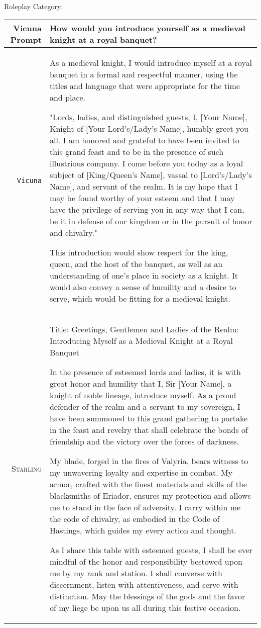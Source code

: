 \documentclass{article}
\newlength\mydepth
\newcommand{\starlingemojititle}{\textsc{Starling}\raisebox{-\mydepth}{\texttt{[image: images/starling-final.png]}}}
\begin{document}
{\newpage
Roleplay Category:

{  \footnotesize \begin{tabularx}{\linewidth}{r X} \toprule Vicuna Prompt  & {\bf How would you introduce yourself as a medieval knight at a royal banquet?}
\\
 \midrule \texttt{Vicuna}  &
As a medieval knight, I would introduce myself at a royal banquet in a formal and respectful manner, using the titles and language that were appropriate for the time and place.

"Lords, ladies, and distinguished guests, I, [Your Name], Knight of [Your Lord's/Lady's Name], humbly greet you all. I am honored and grateful to have been invited to this grand feast and to be in the presence of such illustrious company. I come before you today as a loyal subject of [King/Queen's Name], vassal to [Lord's/Lady's Name], and servant of the realm. It is my hope that I may be found worthy of your esteem and that I may have the privilege of serving you in any way that I can, be it in defense of our kingdom or in the pursuit of honor and chivalry."

This introduction would show respect for the king, queen, and the host of the banquet, as well as an understanding of one's place in society as a knight. It would also convey a sense of humility and a desire to serve, which would be fitting for a medieval knight.
\\
 \midrule \starlingemojititle{}  &
Title: Greetings, Gentlemen and Ladies of the Realm: Introducing Myself as a Medieval Knight at a Royal Banquet

In the presence of esteemed lords and ladies, it is with great honor and humility that I, Sir [Your Name], a knight of noble lineage, introduce myself. As a proud defender of the realm and a servant to my sovereign, I have been summoned to this grand gathering to partake in the feast and revelry that shall celebrate the bonds of friendship and the victory over the forces of darkness.

My blade, forged in the fires of Valyria, bears witness to my unwavering loyalty and expertise in combat. My armor, crafted with the finest materials and skills of the blacksmiths of Eriador, ensures my protection and allows me to stand in the face of adversity. I carry within me the code of chivalry, as embodied in the Code of Hastings, which guides my every action and thought.

As I share this table with esteemed guests, I shall be ever mindful of the honor and responsibility bestowed upon me by my rank and station. I shall converse with discernment, listen with attentiveness, and serve with distinction. May the blessings of the gods and the favor of my liege be upon us all during this festive occasion.
 \\
 \bottomrule
 \end{tabularx} }

}
\end{document}
